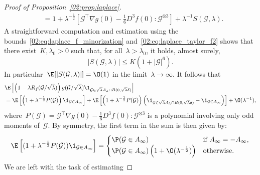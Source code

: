 \begin{proof}[Proof of Proposition~\ref{02:prop:laplace}]
\begin{equation}
\begin{aligned}
                    &= 1 + \lambda^{-\frac12}\left[{\mathcal G}^\intercal \nabla g(0)-\frac16 D^3 f(0):{\mathcal G}^{\otimes 3}\right] + \lambda^{-1} S({\mathcal G},\lambda).
                \end{aligned}
            \end{equation}
            A straightforward computation and estimation using the bounds~\eqref{02:eq:laplace_f_minorization} and~\eqref{02:eq:laplace_taylor_f2} shows that there exist~$K,\lambda_0 >0$ such that, for all~$\lambda>\lambda_0$, it holds, almost surely,
            \begin{equation}
                \left|S({\mathcal G},\lambda)\right| \leq K\left(1+|{\mathcal G}|^6\right).
            \end{equation}
            In particular~$\E[|S({\mathcal G},\lambda)|] = \O(1)$ in the limit~$\lambda\to\infty$.
            It follows that
            \begin{equation}
            \begin{aligned}
                &\E\left[\left(1-\lambda R_f({\mathcal G}/\sqrt\lambda)\right)g({\mathcal G}/\sqrt\lambda)\1_{{\mathcal G} \in \sqrt\lambda A_\lambda \cap B(0,\sqrt\lambda \delta)}\right]\\
                &= \E\left[\left(1+\lambda^{-\frac12}P({\mathcal G})\right)\1_{{\mathcal G}\in A_\infty}\right]+ \E\left[\left(1+\lambda^{-\frac12}P({\mathcal G})\right)\left(\1_{{\mathcal G}\in\sqrt\lambda A_\lambda \cap B(0,\sqrt\lambda\delta)}-\1_{{\mathcal G}\in A_\infty}\right)\right] + \O(\lambda^{-1}),
            \end{aligned}
            \end{equation}
            where~$P({\mathcal G}) = {\mathcal G}^\intercal \nabla g(0)-\frac16 D^3 f(0):{\mathcal G}^{\otimes 3}$ is a polynomial involving only odd moments of~${\mathcal G}$. By symmetry, the first term in the sum is then given by:
            \begin{equation}
                \label{02:eq:laplace_error_b}
                \E\left[(1+\lambda^{-\frac12}P({\mathcal G}))\1_{{\mathcal G}\in A_\infty}\right] = \begin{cases}
                    \P({\mathcal G} \in A_\infty)&\text{if } A_\infty = - A_\infty,\\
                    \P({\mathcal G}\in A_\infty)\left(1+\O(\lambda^{-\frac12})\right)&\text{otherwise.}
                \end{cases}
            \end{equation}
            We are left with the task of estimating

\end{proof}
